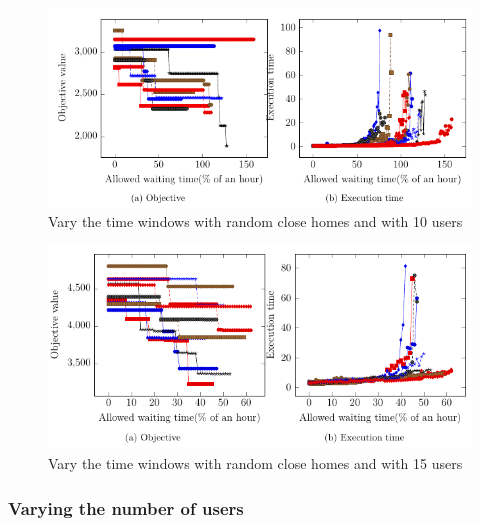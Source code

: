\documentclass[12pt, a4paper, twoside]{memoir}
\begin{document}
{	\begin{figure}[H]
		\centering
		\begin{flushleft}
			\includegraphics[scale=0.9]{img/compiledResults/1.png}
		\end{flushleft}
		\caption{Vary the time windows with random close homes and with 10 users}
		\label{fig:Vary the time windows with random close homes and with 10 users}
	\end{figure}


	\begin{figure}[H]
		\centering
		\begin{flushleft}
			\floatplacement{figure}{t}
			\includegraphics[scale=0.9]{img/compiledResults/2.png}
		\end{flushleft}
		\caption{Vary the time windows with random close homes and with 15 users}
		\label{fig:Vary the time windows with random close homes and with 15 users}
	\end{figure}
	
	\subsubsection{Varying the number of users}

}
\end{document}

